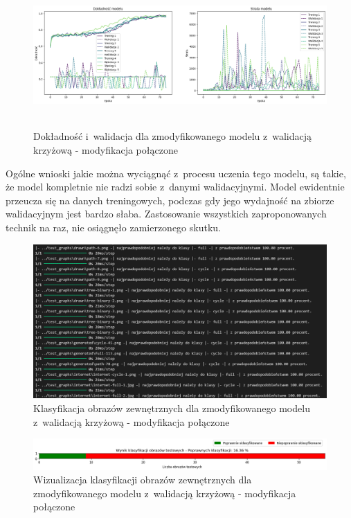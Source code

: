 \begin{figure}[ht]
	\centering
	\includegraphics[height=5.5cm]{resources/tests/images/v4/crossvalid_img.png}
	\caption{Dokładność i~walidacja dla zmodyfikowanego modelu z~walidacją krzyżową - modyfikacja połączone}
	\label{Fig:tests-cv-5a}
\end{figure}
\FloatBarrier

Ogólne wnioski jakie można wyciągnąć z~procesu uczenia tego modelu,
są takie, że model kompletnie nie radzi sobie z~danymi walidacyjnymi.
Model ewidentnie przeucza się na danych treningowych,
podczas gdy jego wydajność na zbiorze walidacyjnym jest bardzo słaba.
Zastosowanie wszystkich zaproponowanych technik na raz,
nie osiągnęło zamierzonego skutku. 

\begin{figure}[ht]
	\centering
	\includegraphics[width=14cm]{resources/tests/images/v4/crossvalid_txt.png}
	\caption{Klasyfikacja obrazów zewnętrznych dla zmodyfikowanego modelu z~walidacją krzyżową - modyfikacja połączone}
	\label{Fig:tests-cv-5b}
\end{figure}
\FloatBarrier

\begin{figure}[ht]
	\centering
	\includegraphics[width=14cm]{resources/tests/images/v4/crossvalid_bar.png}
	\caption{Wizualizacja klasyfikacji obrazów zewnętrznych dla zmodyfikowanego modelu z~walidacją krzyżową - modyfikacja połączone}
	\label{Fig:tests-cv-5c}
\end{figure}
\FloatBarrier

